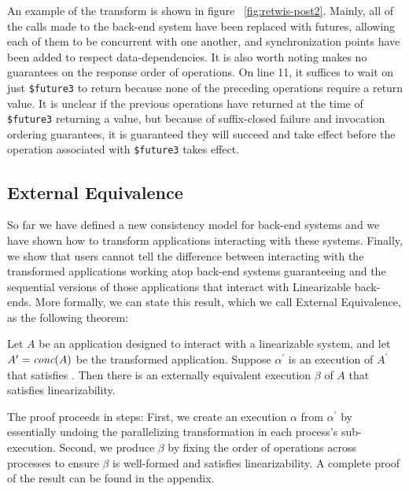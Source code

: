 An example of the transform is shown in figure ~\ref{fig:retwis-post2}. Mainly, all of the calls made to the back-end system have been replaced with futures, allowing each of them to be concurrent with one another, and synchronization points have been added to respect data-dependencies. It is also worth noting \mdl{} makes no guarantees on the response order of operations. On line 11, it suffices to wait on just \texttt{\$future3} to return because none of the preceding operations require a return value. It is unclear if the previous operations have returned at the time of \texttt{\$future3} returning a value, but because of suffix-closed failure and invocation ordering guarantees, it is guaranteed they will succeed and take effect before the operation associated with \texttt{\$future3} takes effect.

\subsection{External Equivalence}
\label{sec:mdl:exteq}
So far we have defined a new consistency model for back-end systems and we have shown how to transform applications interacting with these systems. Finally, we show that users cannot tell the difference between interacting with the transformed applications working atop back-end systems guaranteeing \mdl{} and the sequential versions of those applications that interact with Linearizable back-ends. More formally, we can state this result, which we call External Equivalence, as the following theorem:

\begin{thm}
Let $A$ be an application designed to interact with a linearizable system,
and let $A^\prime = \operatorname*{\textit{conc}}(A)$ be the transformed application. Suppose
$\alpha^\prime$ is an execution of $A^\prime$ that satisfies
\MDL{}. Then there is an externally equivalent execution $\beta$
of $A$ that satisfies linearizability.
\end{thm}

The proof proceeds in steps: First, we create an execution $\alpha$ from
$\alpha^\prime$ by essentially undoing the parallelizing transformation in
each process's sub-execution. Second, we produce $\beta$ by fixing the order
of operations across processes to ensure $\beta$ is well-formed and satisfies linearizability. A complete proof of the result can be found in the appendix. 

